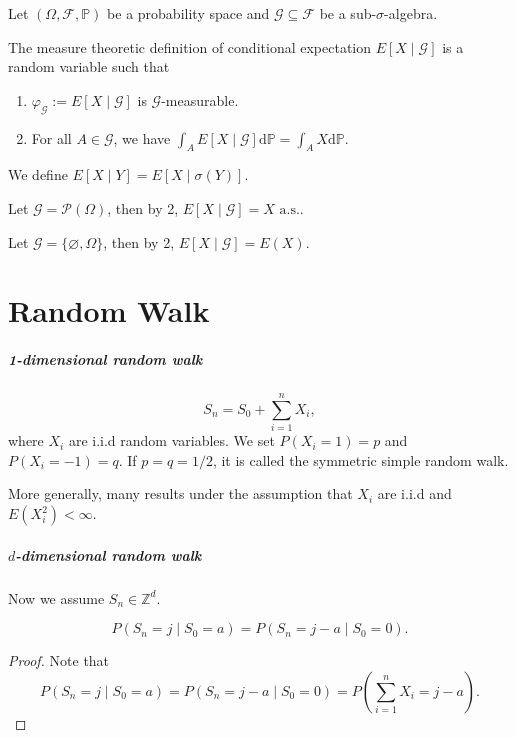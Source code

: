 \documentclass[11pt,singlecolumn, openany, citestyle=authoryear]{elegantbook}
\begin{document}
\begin{CJK}{UTF8}{gbsn}
Let $(\Omega,\mathcal{F},\mathbb{P})$ be a probability space and $\mathcal{G}\subseteq \mathcal{F}$
be a sub-$\sigma$-algebra. 
\begin{definition}
    The measure theoretic definition of conditional expectation $E[X\mid \mathcal{G}]$ is a 
    random variable such that 
    \begin{enumerate}
        \item $\varphi_\mathcal{G}:=E[X\mid \mathcal{G}]$ is $\mathcal{G}$-measurable.
        \item For all $A\in \mathcal{G}$, we have 
        $\displaystyle \int_A E[X\mid \mathcal{G}]\mathrm{d}\mathbb{P}= \int_A X
        \mathrm{d}\mathbb{P}$.
    \end{enumerate}
    We define $E[X\mid Y]=E[X\mid \sigma(Y)]$.
\end{definition}
\begin{example}
    Let $\mathcal{G}=\mathcal{P}(\Omega)$, then by 2,
    $E[X\mid \mathcal{G}]=X \text{ a.s..}$
\end{example}
\begin{example}
    Let $\mathcal{G}=\{\varnothing,\Omega\}$, then by 2,
    $E[X\mid \mathcal{G}]=E(X)$.
\end{example}

\chapter{Random Walk}
\paragraph*{1-dimensional random walk}
$$
S_n = S_0 + \sum_{i=1}^n X_i,
$$
where $X_i$ are i.i.d random variables.
We set $P(X_i=1)=p$ and $P(X_i=-1)=q$. 
If $p=q=1/2$, it is called the symmetric simple random walk.

More generally, many results under the assumption that 
$X_i$ are i.i.d and $E(X_i^2)<\infty$. 

\paragraph*{$d$-dimensional random walk}
Now we assume $S_n \in \mathbb{Z}^d$.
\begin{lemma}
\begin{equation}
    P(S_n=j\mid S_0 = a)=P(S_n = j-a\mid S_0=0).
\end{equation}
\end{lemma}
\begin{proof}
    Note that 
    $$
    P(S_n=j\mid S_0 = a)=P(S_n = j-a\mid S_0=0) = 
    P(\sum_{i=1}^n X_i=j-a).
    $$
\end{proof}


\end{CJK}
\end{document}
